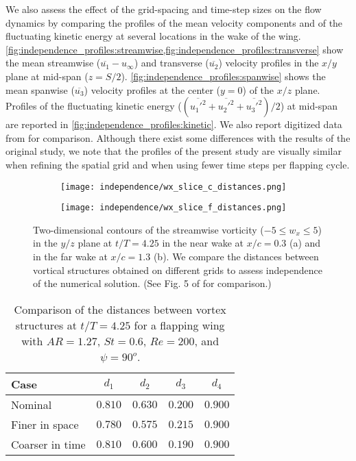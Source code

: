 We also assess the effect of the grid-spacing and time-step sizes on the flow dynamics by comparing the profiles of the mean velocity components and of the fluctuating kinetic energy at several locations in the wake of the wing.
\cref{fig:independence_profiles:streamwise,fig:independence_profiles:transverse} show the mean streamwise ($\overline{u_1} - u_\infty$) and transverse ($\overline{u_2}$) velocity profiles in the $x/y$ plane at mid-span ($z = S / 2$).
\cref{fig:independence_profiles:spanwise} shows the mean spanwise ($\overline{u_3}$) velocity profiles at the center ($y = 0$) of the $x/z$ plane.
Profiles of the fluctuating kinetic energy ($( \overline{{u_1'}^2} + \overline{{u_2'}^2} + \overline{{u_3'}^2} ) / 2$) at mid-span are reported in \cref{fig:independence_profiles:kinetic}.
We also report digitized data from \citet{li_dong_2016} for comparison.
Although there exist some differences with the results of the original study, we note that the profiles of the present study are visually similar when refining the spatial grid and when using fewer time steps per flapping cycle.

\begin{figure}[!h]
  \centering
  \begin{subfigure}[c]{0.35\textwidth}
    \centering
    \texttt{[image: independence/wx\_slice\_c\_distances.png]}
    \caption{}
  \end{subfigure}
  \hspace{1em}
  \begin{subfigure}[c]{0.35\textwidth}
    \centering
    \texttt{[image: independence/wx\_slice\_f\_distances.png]}
    \caption{}
  \end{subfigure}
  \caption{Two-dimensional contours of the streamwise vorticity ($-5 \leq w_x \leq 5$) in the $y/z$ plane at $t/T = 4.25$ in the near wake at $x / c = 0.3$ (a) and in the far wake at $x / c = 1.3$ (b). We compare the distances between vortical structures obtained on different grids to assess independence of the numerical solution. (See Fig. 5 of \citet{li_dong_2016} for comparison.)}
  \label{fig:independence_wx_distances}
\end{figure}

\begin{table}[!h]
  \centering
  \begin{tabular}{lcccc}
    \hline\hline
    Case & $d_1$ & $d_2$ & $d_3$ & $d_4$ \\
    \hline
    Nominal & $0.810$ & $0.630$ & $0.200$ & $0.900$ \\
    Finer in space & $0.780$ & $0.575$ & $0.215$ & $0.900$ \\
    Coarser in time & $0.810$ & $0.600$ & $0.190$ & $0.900$ \\
    \hline\hline
  \end{tabular}
  \caption{Comparison of the distances between vortex structures at $t / T = 4.25$ for a flapping wing with $AR = 1.27$, $St = 0.6$, $Re = 200$, and $\psi = 90^o$.}
  \label{tab:independence_wx_distances}
\end{table}

